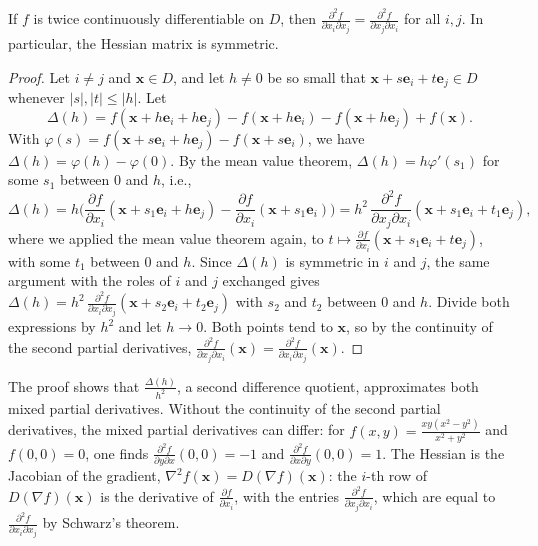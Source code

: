 \begin{theorem}[Schwarz]\label{L3-thm:schwarz}
    If $f$ is twice continuously differentiable on $D$, then $\frac{\partial^2 f}{\partial x_i \partial x_j} = \frac{\partial^2 f}{\partial x_j \partial x_i}$ for all $i, j$. In particular, the Hessian matrix is symmetric.
\end{theorem}

\begin{proof}
    Let $i \neq j$ and $\mathbf{x} \in D$, and let $h \neq 0$ be so small that $\mathbf{x} + s\mathbf{e}_i + t\mathbf{e}_j \in D$ whenever $|s|, |t| \leq |h|$. Let
    \[\Delta(h) = f(\mathbf{x} + h\mathbf{e}_i + h\mathbf{e}_j) - f(\mathbf{x} + h\mathbf{e}_i) - f(\mathbf{x} + h\mathbf{e}_j) + f(\mathbf{x}).\]
    With $\varphi(s) = f(\mathbf{x} + s\mathbf{e}_i + h\mathbf{e}_j) - f(\mathbf{x} + s\mathbf{e}_i)$, we have $\Delta(h) = \varphi(h) - \varphi(0)$. By the mean value theorem, $\Delta(h) = h\varphi'(s_1)$ for some $s_1$ between $0$ and $h$, i.e.,
    \[\Delta(h) = h\Big(\frac{\partial f}{\partial x_i}(\mathbf{x} + s_1\mathbf{e}_i + h\mathbf{e}_j) - \frac{\partial f}{\partial x_i}(\mathbf{x} + s_1\mathbf{e}_i)\Big) = h^2\,\frac{\partial^2 f}{\partial x_j \partial x_i}(\mathbf{x} + s_1\mathbf{e}_i + t_1\mathbf{e}_j),\]
    where we applied the mean value theorem again, to $t \mapsto \frac{\partial f}{\partial x_i}(\mathbf{x} + s_1\mathbf{e}_i + t\mathbf{e}_j)$, with some $t_1$ between $0$ and $h$. Since $\Delta(h)$ is symmetric in $i$ and $j$, the same argument with the roles of $i$ and $j$ exchanged gives $\Delta(h) = h^2\,\frac{\partial^2 f}{\partial x_i \partial x_j}(\mathbf{x} + s_2\mathbf{e}_i + t_2\mathbf{e}_j)$ with $s_2$ and $t_2$ between $0$ and $h$. Divide both expressions by $h^2$ and let $h \to 0$. Both points tend to $\mathbf{x}$, so by the continuity of the second partial derivatives, $\frac{\partial^2 f}{\partial x_j \partial x_i}(\mathbf{x}) = \frac{\partial^2 f}{\partial x_i \partial x_j}(\mathbf{x})$.
\end{proof}

The proof shows that $\frac{\Delta(h)}{h^2}$, a second difference quotient, approximates both mixed partial derivatives. Without the continuity of the second partial derivatives, the mixed partial derivatives can differ: for $f(x, y) = \frac{xy(x^2 - y^2)}{x^2 + y^2}$ and $f(0, 0) = 0$, one finds $\frac{\partial^2 f}{\partial y \partial x}(0, 0) = -1$ and $\frac{\partial^2 f}{\partial x \partial y}(0, 0) = 1$. The Hessian is the Jacobian of the gradient, $\nabla^2 f(\mathbf{x}) = D(\nabla f)(\mathbf{x})$: the $i$-th row of $D(\nabla f)(\mathbf{x})$ is the derivative of $\frac{\partial f}{\partial x_i}$, with the entries $\frac{\partial^2 f}{\partial x_j \partial x_i}$, which are equal to $\frac{\partial^2 f}{\partial x_i \partial x_j}$ by Schwarz's theorem.

